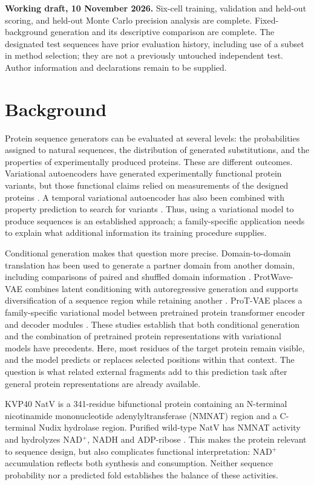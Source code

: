 \documentclass[referee,pdflatex,sn-vancouver-num]{sn-jnl}
\begin{document}
\noindent\textbf{Working draft, 10 November 2026.} Six-cell training, validation and held-out scoring, and held-out Monte Carlo precision analysis are complete. Fixed-background generation and its descriptive comparison are complete. The designated test sequences have prior evaluation history, including use of a subset in method selection; they are not a previously untouched independent test. Author information and declarations remain to be supplied.

\section{Background}
Protein sequence generators can be evaluated at several levels: the probabilities assigned to natural sequences, the distribution of generated substitutions, and the properties of experimentally produced proteins. These are different outcomes. Variational autoencoders have generated experimentally functional protein variants, but those functional claims relied on measurements of the designed proteins \cite{hawkins2021}. A temporal variational autoencoder has also been combined with property prediction to search for variants \cite{li2023}. Thus, using a variational model to produce sequences is an established approach; a family-specific application needs to explain what additional information its training procedure supplies.

Conditional generation makes that question more precise. Domain-to-domain translation has been used to generate a partner domain from another domain, including comparisons of paired and shuffled domain information \cite{meynard2023}. ProtWave-VAE combines latent conditioning with autoregressive generation and supports diversification of a sequence region while retaining another \cite{praljak2023}. ProT-VAE places a family-specific variational model between pretrained protein transformer encoder and decoder modules \cite{sevgen2025}. These studies establish that both conditional generation and the combination of pretrained protein representations with variational models have precedents. Here, most residues of the target protein remain visible, and the model predicts or replaces selected positions within that context. The question is what related external fragments add to this prediction task after general protein representations are already available.

KVP40 NatV is a 341-residue bifunctional protein containing an N-terminal nicotinamide mononucleotide adenylyltransferase (NMNAT) region and a C-terminal Nudix hydrolase region. Purified wild-type NatV has NMNAT activity and hydrolyzes NAD$^+$, NADH and ADP-ribose \cite{lee2017}. This makes the protein relevant to sequence design, but also complicates functional interpretation: NAD$^+$ accumulation reflects both synthesis and consumption. Neither sequence probability nor a predicted fold establishes the balance of these activities.
\end{document}
